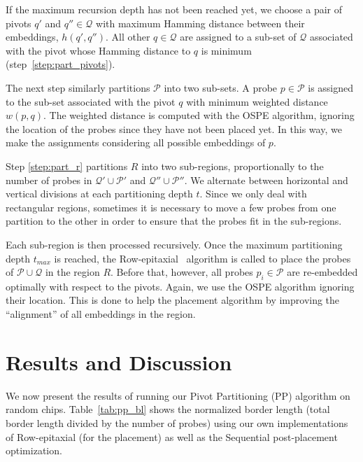 \documentclass{llncs}
\begin{document}
If the maximum recursion depth has not been reached yet, we choose a pair of
pivots $q'$ and $q'' \in \mathcal{Q}$ with maximum Hamming distance
between their embeddings, $h(q',q'')$. All other $q \in \mathcal{Q}$ are
assigned to a sub-set of $\mathcal{Q}$ associated with the pivot whose
Hamming distance to $q$ is minimum (step~\ref{step:part_pivots}).

The next step similarly partitions $\mathcal{P}$ into two sub-sets. A probe
$p \in \mathcal{P}$ is assigned to the sub-set associated with the pivot $q$
with minimum weighted distance $w(p,q)$. The weighted distance is computed
with the OSPE algorithm, ignoring the location of the probes since they have
not been placed yet. In this way, we make the assignments considering all
possible embeddings of $p$.

Step \ref{step:part_r} partitions $R$ into two sub-regions, proportionally to the
number of probes in $\mathcal{Q}' \cup \mathcal{P}'$ and $\mathcal{Q}'' \cup \mathcal{P}''$.
We alternate between horizontal and vertical divisions at each partitioning depth $t$.
Since we only deal with rectangular regions, sometimes it is necessary to move
a few probes from one partition to the other in order to ensure that the probes
fit in the sub-regions.

Each sub-region is then processed recursively. Once the maximum partitioning depth
$t_{max}$ is reached, the Row-epitaxial~\cite{KAHNG03A} algorithm is
called to place the probes of $\mathcal{P} \cup \mathcal{Q}$ in the region $R$.
Before that, however, all probes $p_i \in \mathcal{P}$ are re-embedded optimally
with respect to the pivots. Again, we use the OSPE algorithm ignoring their location.
This is done to help the placement algorithm by improving the ``alignment'' of all
embeddings in the region.

\section{Results and Discussion}
\label{sec:results}

We now present the results of running our Pivot Partitioning (PP) algorithm on
random chips. Table~\ref{tab:pp_bl} shows the normalized border length (total border
length divided by the number of probes) using our own implementations of Row-epitaxial
(for the placement) as well as the Sequential post-placement optimization.
\end{document}
